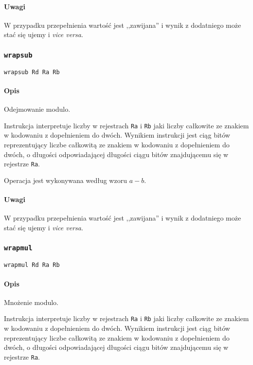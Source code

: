 \paragraph*{Uwagi}

W przypadku przepełnienia wartość jest ,,zawijana'' i wynik z dodatniego może
stać się ujemy i \emph{vice versa}.

\subsubsection{\texttt{wrapsub}}

\begin{lstlisting}
wrapsub Rd Ra Rb
\end{lstlisting}

\paragraph*{Opis} Odejmowanie modulo.

Instrukcja interpretuje liczby w rejestrach \texttt{Ra} i \texttt{Rb} jaki
liczby całkowite ze znakiem w kodowaniu z dopełnieniem do dwóch. Wynikiem
instrukcji jest ciąg bitów reprezentujący liczbe całkowitą ze znakiem w
kodowaniu z dopełnieniem do dwóch, o długości odpowiadającej długości ciągu
bitów znajdującemu się w rejestrze \texttt{Ra}.

Operacja jest wykonywana według wzoru $a - b$.

\paragraph*{Uwagi}

W przypadku przepełnienia wartość jest ,,zawijana'' i wynik z dodatniego może
stać się ujemy i \emph{vice versa}.

\subsubsection{\texttt{wrapmul}}

\begin{lstlisting}
wrapmul Rd Ra Rb
\end{lstlisting}

\paragraph*{Opis} Mnożenie modulo.

Instrukcja interpretuje liczby w rejestrach \texttt{Ra} i \texttt{Rb} jaki
liczby całkowite ze znakiem w kodowaniu z dopełnieniem do dwóch. Wynikiem
instrukcji jest ciąg bitów reprezentujący liczbe całkowitą ze znakiem w
kodowaniu z dopełnieniem do dwóch, o długości odpowiadającej długości ciągu
bitów znajdującemu się w rejestrze \texttt{Ra}.

